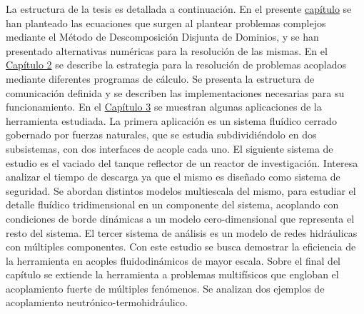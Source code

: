 La estructura de la tesis es detallada a continuación.
En el presente \hyperlink{chapter.1}{capítulo} se han planteado las ecuaciones que surgen al plantear problemas complejos mediante el Método de Descomposición Disjunta de Dominios,
y se han presentado alternativas numéricas para la resolución de las mismas.
En el \hyperlink{chapter.2}{Capítulo 2} se describe la estrategia para la resolución de problemas acoplados mediante diferentes programas de cálculo.
Se presenta la estructura de comunicación definida y se describen las implementaciones necesarias para su funcionamiento.
En el \hyperlink{chapter.3}{Capítulo 3} se muestran algunas aplicaciones de la herramienta estudiada.
La primera aplicación es un sistema fluídico cerrado gobernado por fuerzas naturales, que se estudia subdividiéndolo en dos subsistemas, con dos interfaces de acople cada uno.
El siguiente sistema de estudio es el vaciado del tanque reflector de un reactor de investigación.
Interesa analizar el tiempo de descarga ya que el mismo es diseñado como sistema de seguridad.
Se abordan distintos modelos multiescala del mismo, para estudiar el detalle fluídico tridimensional en un componente del sistema,
acoplando con condiciones de borde dinámicas a un modelo cero-dimensional que representa el resto del sistema.
El tercer sistema de análisis es un modelo de redes hidráulicas con múltiples componentes.
Con este estudio se busca demostrar la eficiencia de la herramienta en acoples fluidodinámicos de mayor escala.
Sobre el final del capítulo se extiende la herramienta a problemas multifísicos que engloban el acoplamiento fuerte de múltiples fenómenos.
Se analizan dos ejemplos de acoplamiento neutrónico-termohidráulico.

